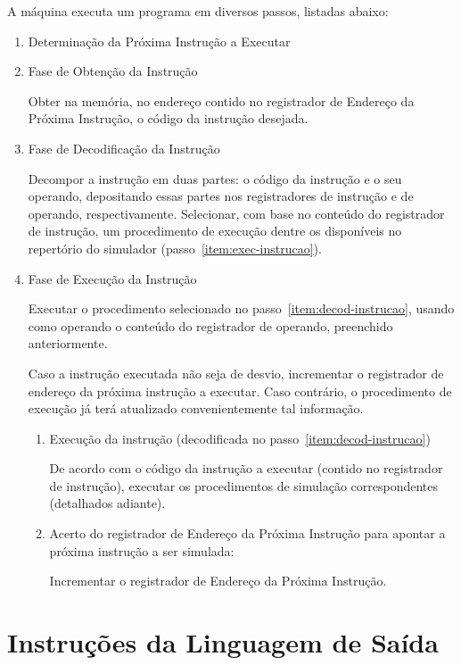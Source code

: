 A máquina executa um programa em diversos passos, listadas abaixo:

\begin{enumerate}
	\item Determinação da Próxima Instrução a Executar
	\item Fase de Obtenção da Instrução

	Obter na memória, no endereço contido no registrador de Endereço da Próxima Instrução, o código da instrução desejada.
	
	\item Fase de Decodificação da Instrução
	\label{item:decod-instrucao}

	Decompor a instrução em duas partes: o código da instrução e o seu operando, depositando essas partes nos registradores de instrução e de operando, respectivamente. Selecionar, com base no conteúdo do registrador de instrução, um procedimento de execução dentre os disponíveis no repertório do simulador (passo~\ref{item:exec-instrucao}).

	\item Fase de Execução da Instrução
	\label{item:exec-instrucao}
	
	Executar o procedimento selecionado no passo~\ref{item:decod-instrucao}, usando como operando o conteúdo do registrador de operando, preenchido anteriormente.
	
	Caso a instrução executada não seja de desvio, incrementar o registrador de endereço da próxima instrução a executar. Caso contrário, o procedimento de execução já terá atualizado convenientemente tal informação.
	
	\begin{enumerate}
		\item Execução da instrução (decodificada no passo~\ref{item:decod-instrucao})

		De acordo com o código da instrução a executar (contido no registrador de instrução), executar os procedimentos de simulação correspondentes (detalhados adiante).
		
		\item Acerto do registrador de Endereço da Próxima Instrução para apontar a próxima instrução a ser simulada:

		Incrementar o registrador de Endereço da Próxima Instrução.
	\end{enumerate}
	
\end{enumerate}


\section{Instruções da Linguagem de Saída}


